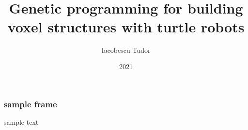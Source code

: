 \documentclass{beamer}
\title{Genetic programming for building voxel structures with turtle robots}
\author{Iacobescu Tudor}
\date{2021}
\begin{document}
    
\frame{\titlepage}

\begin{frame}
    \frametitle{sample frame}

    sample text
    
\end{frame}
\end{document}
